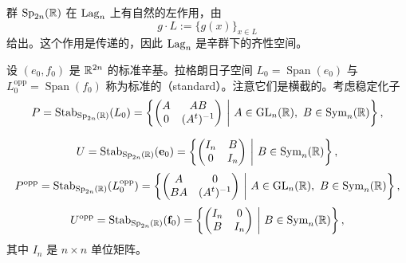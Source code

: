 群 $\operatorname{Sp}_{2n}(\mathbb{R})$ 在 $\operatorname{Lag}_n$ 上有自然的左作用，由
\[
g\cdot L:=\{g(x)\}_{x\in L}
\]
给出。这个作用是传递的，因此 $\operatorname{Lag}_n$ 是辛群下的齐性空间。

设 $(e_0,f_0)$ 是 $\mathbb{R}^{2n}$ 的标准辛基。拉格朗日子空间 $L_0=\operatorname{Span}(e_0)$ 与 $L_0^{\mathrm{opp}}=\operatorname{Span}(f_0)$ 称为标准的（standard）。注意它们是横截的。考虑稳定化子
\[
P=\Stab_{\Sp_{2n}(\R)}(L_0)
=\left\{\begin{pmatrix} A & AB\\ 0 & (A^{t})^{-1}\end{pmatrix}\ \middle|\ A\in\GL_n(\R),\ B\in\Sym_n(\R)\right\},
\]


\[
U=\Stab_{\Sp_{2n}(\R)}(\mathbf{e}_0)
=\left\{\begin{pmatrix} I_n & B\\ 0 & I_n\end{pmatrix}\ \middle|\ B\in\Sym_n(\R)\right\},
\]
\[
P^{\mathrm{opp}}=\Stab_{\Sp_{2n}(\R)}(L_0^{\mathrm{opp}})
=\left\{\begin{pmatrix} A & 0\\ BA & (A^{t})^{-1}\end{pmatrix}\ \middle|\ A\in\GL_n(\R),\ B\in\Sym_n(\R)\right\},
\]
\[
U^{\mathrm{opp}}=\Stab_{\Sp_{2n}(\R)}(\mathbf{f}_0)
=\left\{\begin{pmatrix} I_n & 0\\ B & I_n\end{pmatrix}\ \middle|\ B\in\Sym_n(\R)\right\},
\]
其中 $I_n$ 是 $n\times n$ 单位矩阵。

